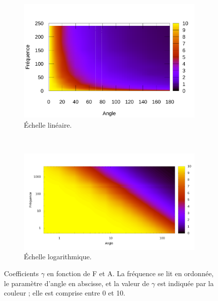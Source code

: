 	\begin{figure}[!htb]
		\centering
		\begin{subfigure}[t]{0.485\textwidth}
			\centering
			\includegraphics[width=\textwidth]{figures/ch4/linApprox}
			\caption{Échelle linéaire.}
			\label{fig:gammaVfaLin}
		\end{subfigure}
		~
		\begin{subfigure}[t]{0.485\textwidth}
			\centering
			\includegraphics[width=\textwidth]{figures/ch4/linApprox_log}
			\caption{Échelle logarithmique.}
			\label{fig:gammaVfaLog}
		\end{subfigure}
		\caption[Coefficients $\gamma$ en fonction de F et A]{Coefficients $\gamma$ en fonction de F et A. La fréquence se lit en ordonnée, le paramètre d'angle en abscisse, et la valeur de $\gamma$ est indiquée par la couleur ; elle est comprise entre 0 et 10.}
		\label{fig:gammaVfa}
	\end{figure}
	
